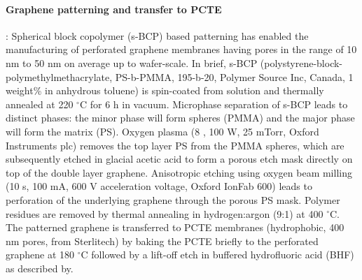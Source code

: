 \paragraph{Graphene patterning and transfer to PCTE}: Spherical block
copolymer (s-BCP) based patterning has enabled the manufacturing of
perforated graphene membranes having pores in the range of 10 nm to 50
nm on average up to wafer-scale\cite{Choi_2018_wafer_scale_gr}. In
brief, s-BCP (polystyrene-block-polymethylmethacrylate, PS-b-PMMA,
195-b-20, Polymer Source Inc, Canada, 1 weight\% in anhydrous toluene)
is spin-coated from solution and thermally annealed at 220 $^{\circ}$C
for 6 h in vacuum. Microphase separation of s-BCP leads to distinct
phases: the minor phase will form spheres (PMMA) and the major phase
will form the matrix (PS). Oxygen plasma (8 , 100 W, 25 mTorr, Oxford
Instruments plc) removes the top layer PS from the PMMA spheres, which
are subsequently etched in glacial acetic acid to form a porous etch
mask directly on top of the double layer graphene. Anisotropic etching
using oxygen beam milling (10 s, 100 mA, 600 V acceleration voltage,
Oxford IonFab 600) leads to perforation of the underlying graphene
through the porous PS mask. Polymer residues are removed by thermal
annealing in hydrogen:argon (9:1) at 400 $^{\circ}$C. The patterned
graphene is transferred to PCTE membranes (hydrophobic, 400 nm pores,
from Sterlitech) by baking the PCTE briefly to the perforated graphene
at 180 $^{\circ}$C followed by a lift-off etch in buffered
hydrofluoric acid (BHF) as described
by\cite{Choi_2018_wafer_scale_gr}.

\vspace{1em}
\noindent
